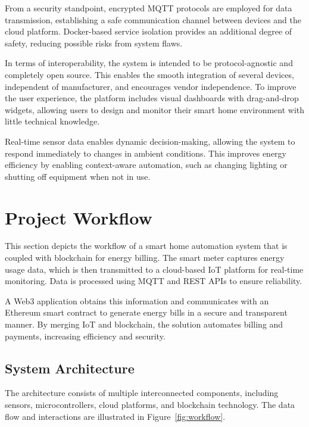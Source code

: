 \documentclass[a4paper,12pt]{report}
\begin{document}
From a security standpoint, encrypted MQTT protocols are employed for data transmission, establishing a safe communication channel between devices and the cloud platform. Docker-based service isolation provides an additional degree of safety, reducing possible risks from system flaws.

In terms of interoperability, the system is intended to be protocol-agnostic and completely open source. This enables the smooth integration of several devices, independent of manufacturer, and encourages vendor independence. To improve the user experience, the platform includes visual dashboards with drag-and-drop widgets, allowing users to design and monitor their smart home environment with little technical knowledge.

Real-time sensor data enables dynamic decision-making, allowing the system to respond immediately to changes in ambient conditions. This improves energy efficiency by enabling context-aware automation, such as changing lighting or shutting off equipment when not in use.

\section{Project Workflow}

This section depicts the workflow of a smart home automation system that is coupled with blockchain for energy billing. The smart meter captures energy usage data, which is then transmitted to a cloud-based IoT platform for real-time monitoring\cite{jain2014raspberry}\cite{chaudhari2017smart}. Data is processed using MQTT and REST APIs to ensure reliability\cite{Atmoko_2017}.

A Web3 application obtains this information and communicates with an Ethereum smart contract to generate energy bills in a secure and transparent manner\cite{10.1145/3328833.3328857}\cite{Hu2018BlockchainbasedSC}. By merging IoT and blockchain, the solution automates billing and payments, increasing efficiency and security.

\subsection{System Architecture}

The architecture consists of multiple interconnected components, including sensors, microcontrollers, cloud platforms, and blockchain technology. The data flow and interactions are illustrated in Figure~\ref{fig:workflow}.
\end{document}
